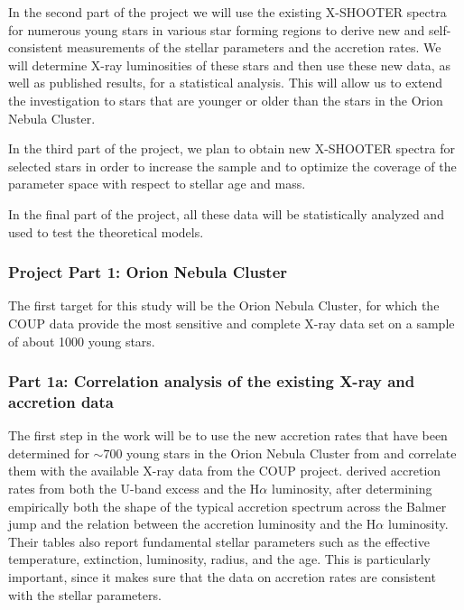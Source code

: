 \documentclass[10pt,fleqn,twoside,a4paper]{article}
\begin{document}
In the second part of the project we will use the existing X-SHOOTER spectra for
numerous young stars
in various star forming regions to derive new and self-consistent 
measurements of the
stellar parameters and the accretion rates. 
We will determine X-ray luminosities of these stars and then
use these new data,
as well as published results, for a  statistical analysis.
This will allow us to extend the investigation to stars that are
younger or older than the stars in the Orion Nebula Cluster.


\smallskip

In the third part of the project, we plan to obtain new 
X-SHOOTER spectra for selected stars in order to increase the sample
and to optimize the coverage of the parameter space with respect
to stellar age and mass.

\smallskip

In the final part of the project,
all these data will be statistically analyzed and
used to test the theoretical models.


\subsubsection*{Project Part 1: Orion Nebula Cluster}



The first target for this study will be the Orion Nebula Cluster,
for which the COUP data provide the most sensitive and complete
X-ray data set on a sample of about 1000 young stars.

\subsubsection*{Part 1a: Correlation analysis of the existing X-ray and accretion data}

The first step in the work will be to use the new accretion rates
that have been  determined for $\sim 700$ young stars
in the Orion Nebula Cluster from \citet{Manara12} and correlate them
with the available X-ray data from the COUP project.
%
\citet{Manara12} derived accretion rates from both the U-band excess and the H$\alpha$ luminosity,
after determining empirically both the shape of the typical accretion spectrum across the
Balmer jump and the relation between the accretion luminosity and the  
H$\alpha$ luminosity.
Their tables also report fundamental stellar parameters such as the
effective temperature, extinction, luminosity, radius, and the age. This is
particularly important, since it makes sure that the data on accretion rates are
consistent with the stellar parameters.
\end{document}
